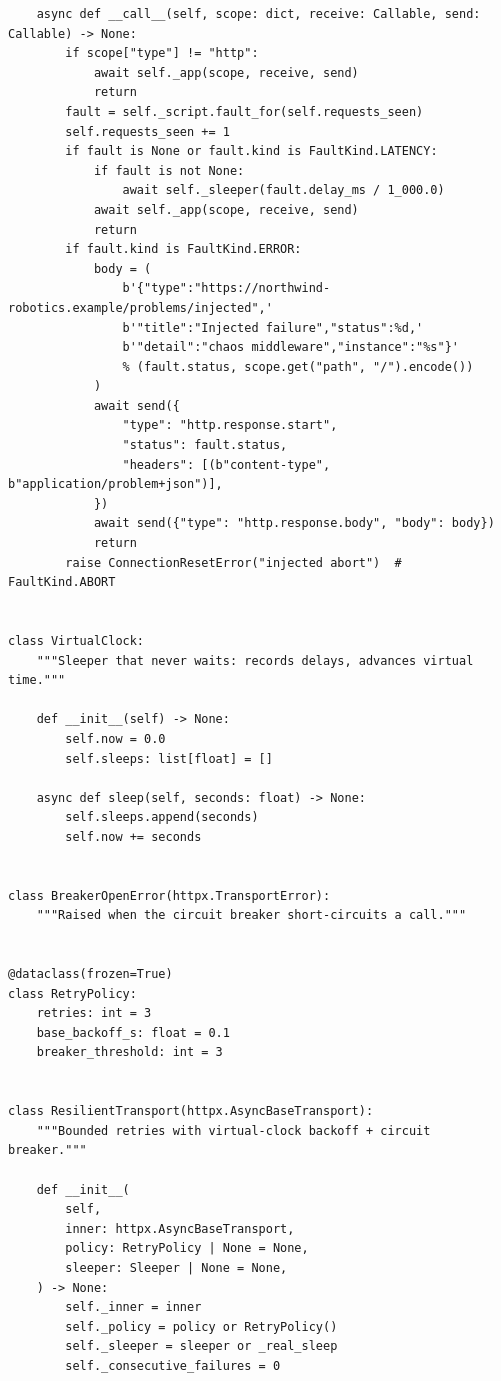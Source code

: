 \begin{verbatim}
    async def __call__(self, scope: dict, receive: Callable, send: Callable) -> None:
        if scope["type"] != "http":
            await self._app(scope, receive, send)
            return
        fault = self._script.fault_for(self.requests_seen)
        self.requests_seen += 1
        if fault is None or fault.kind is FaultKind.LATENCY:
            if fault is not None:
                await self._sleeper(fault.delay_ms / 1_000.0)
            await self._app(scope, receive, send)
            return
        if fault.kind is FaultKind.ERROR:
            body = (
                b'{"type":"https://northwind-robotics.example/problems/injected",'
                b'"title":"Injected failure","status":%d,'
                b'"detail":"chaos middleware","instance":"%s"}'
                % (fault.status, scope.get("path", "/").encode())
            )
            await send({
                "type": "http.response.start",
                "status": fault.status,
                "headers": [(b"content-type", b"application/problem+json")],
            })
            await send({"type": "http.response.body", "body": body})
            return
        raise ConnectionResetError("injected abort")  # FaultKind.ABORT


class VirtualClock:
    """Sleeper that never waits: records delays, advances virtual time."""

    def __init__(self) -> None:
        self.now = 0.0
        self.sleeps: list[float] = []

    async def sleep(self, seconds: float) -> None:
        self.sleeps.append(seconds)
        self.now += seconds


class BreakerOpenError(httpx.TransportError):
    """Raised when the circuit breaker short-circuits a call."""


@dataclass(frozen=True)
class RetryPolicy:
    retries: int = 3
    base_backoff_s: float = 0.1
    breaker_threshold: int = 3


class ResilientTransport(httpx.AsyncBaseTransport):
    """Bounded retries with virtual-clock backoff + circuit breaker."""

    def __init__(
        self,
        inner: httpx.AsyncBaseTransport,
        policy: RetryPolicy | None = None,
        sleeper: Sleeper | None = None,
    ) -> None:
        self._inner = inner
        self._policy = policy or RetryPolicy()
        self._sleeper = sleeper or _real_sleep
        self._consecutive_failures = 0


\end{verbatim}
